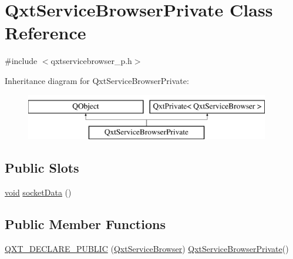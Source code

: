 \hypertarget{class_qxt_service_browser_private}{\section{Qxt\-Service\-Browser\-Private Class Reference}
\label{class_qxt_service_browser_private}
}


{\ttfamily \#include $<$qxtservicebrowser\-\_\-p.\-h$>$}

Inheritance diagram for Qxt\-Service\-Browser\-Private\-:\begin{figure}[H]
\begin{center}
\leavevmode
\includegraphics[height=2.000000cm]{class_qxt_service_browser_private}
\end{center}
\end{figure}
\subsection*{Public Slots}
\begin{DoxyCompactItemize}
\item 
\hyperlink{group___u_a_v_objects_plugin_ga444cf2ff3f0ecbe028adce838d373f5c}{void} \hyperlink{class_qxt_service_browser_private_a5431838e2a3ba1a0995137ca20d40d5f}{socket\-Data} ()
\end{DoxyCompactItemize}
\subsection*{Public Member Functions}
\begin{DoxyCompactItemize}
\item 
\hyperlink{class_qxt_service_browser_private_a12c728aa016b8272cfabb0f3694ae4c2}{Q\-X\-T\-\_\-\-D\-E\-C\-L\-A\-R\-E\-\_\-\-P\-U\-B\-L\-I\-C} (\hyperlink{class_qxt_service_browser}{Qxt\-Service\-Browser}) \hyperlink{class_qxt_service_browser_private}{Qxt\-Service\-Browser\-Private}()
\end{DoxyCompactItemize}
